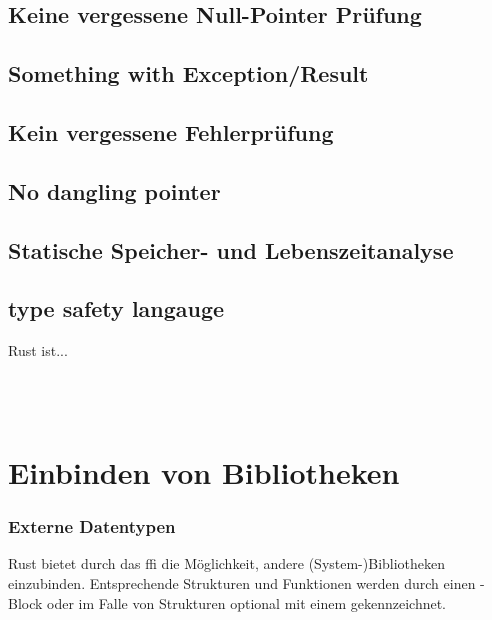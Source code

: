 \subsection{Keine vergessene Null-Pointer Prüfung}
\label{rust:no_null}
\subsection{Something with Exception/Result}
\subsection{Kein vergessene Fehlerprüfung}
\subsection{No dangling pointer}
\subsection{Statische Speicher- und Lebenszeitanalyse}
\subsection{type safety langauge}





Rust ist...

 \\
 \\
\cite{rust:orly_programming}


\section{Einbinden von Bibliotheken}

\subsubsection{Externe Datentypen}
\label{rust:ffi:datatypes}

Rust bietet durch das \gls{ffi} die Möglichkeit, andere (System-)Bibliotheken einzubinden.
Entsprechende Strukturen und Funktionen werden durch einen -Block
oder im Falle von Strukturen optional mit einem \rustcinline{#[repr(C)]} gekennzeichnet.

